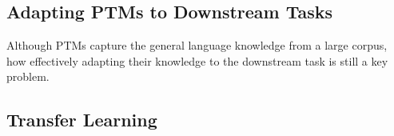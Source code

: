\documentclass[fleqn]{SCYE-arxiv}
\begin{document}
\begin{multicols}{2}









\section{Adapting PTMs to Downstream Tasks}
\label{sec:adapt}

Although PTMs capture the general language knowledge from a large corpus, how effectively adapting their knowledge to the downstream task is still a key problem.

\subsection{Transfer Learning}


\end{multicols}
\end{document}
